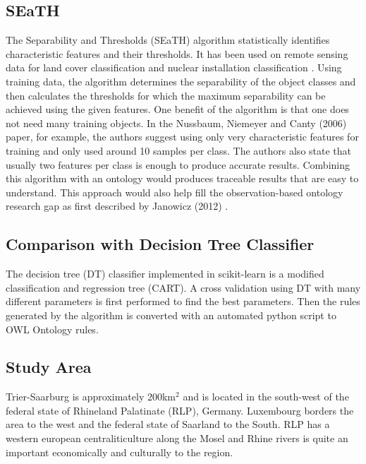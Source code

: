 \documentclass[authoryear, review,12pt,number]{elsarticle}
\begin{document}
\subsection{SEaTH} The Separability and Thresholds (SEaTH) algorithm
\citep{Nussbaum2006} statistically identifies characteristic features and their thresholds. It has
been used on remote sensing data for land cover classification \citep{Gao2011}
and nuclear installation classification \citep{Nussbaum2006}.
Using training data, the algorithm determines the separability of the object
classes and then calculates the thresholds for which the maximum separability
can be achieved using the given features. One benefit of the algorithm is that
one does not need many training objects.
In the Nussbaum, Niemeyer and Canty (2006) paper, for example, the authors
suggest using only very characteristic features for training and only used
around 10 samples per class\citep{Nussbaum2006}. The authors also state that
usually two features per class is enough to produce accurate results. Combining
this algorithm with an ontology would produces traceable results that are easy
to understand. This approach would also help fill the observation-based ontology
research gap as first described by Janowicz (2012) \citep{Janowicz2012}.

\subsection{Comparison with Decision Tree Classifier}
The decision tree (DT) classifier implemented in scikit-learn is a modified
classification and regression tree (CART)\citep{scikit-learn}. A cross
validation using DT with many different parameters is first performed to find the best
parameters. Then the rules generated by the algorithm is converted with an
automated python script to OWL Ontology rules.

%

\subsection{Study Area}
Trier-Saarburg is approximately 200km$^{2}$ and is located in the south-west of 
the federal state of Rhineland Palatinate (RLP), Germany. Luxembourg borders 
the area to the west and the federal state of Saarland to the South. 
RLP has a western european centraliticulture along the Mosel and Rhine rivers 
is quite an important economically and culturally to the region. 
\end{document}

